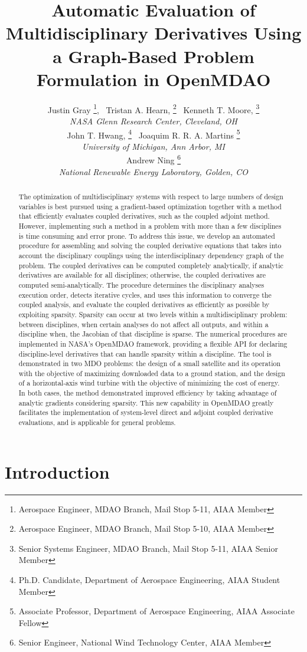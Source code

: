 \documentclass[]{aiaa-tc} %
\title{Automatic Evaluation of Multidisciplinary Derivatives Using a Graph-Based Problem Formulation in OpenMDAO}
\author{
  Justin Gray%
     \thanks{Aerospace Engineer, MDAO Branch, Mail Stop 5-11, AIAA Member},
  \ Tristan A. Hearn,%
     \thanks{Aerospace Engineer, MDAO Branch, Mail Stop 5-10, AIAA Member}
  \ Kenneth T. Moore,%
     \thanks{Senior Systems Engineer, MDAO Branch, Mail Stop 5-11, AIAA Senior Member}
   \\
  {\normalsize\itshape
  NASA Glenn Research Center, Cleveland, OH}  \\
  John T. Hwang,%
  \thanks{Ph.D. Candidate, Department of Aerospace Engineering, AIAA Student Member}
  \ Joaquim R. R. A. Martins%
  \thanks{Associate Professor, Department of Aerospace Engineering, AIAA Associate Fellow}
  \\
  {\normalsize\itshape
   University of Michigan, Ann Arbor, MI}\\
  Andrew Ning
    \thanks{Senior Engineer, National Wind Technology Center, AIAA Member}
  \\
  {\normalsize\itshape
   National Renewable Energy Laboratory, Golden, CO}
}
\begin{document}
  \maketitle

  \begin{abstract}

The optimization of multidisciplinary systems with respect to large numbers of design variables is best pursued using a gradient-based optimization together with a method that efficiently evaluates coupled derivatives, such as the coupled adjoint method. However, implementing such a method in a problem with more than a few disciplines is time consuming and error prone. To address this issue, we develop an automated procedure for assembling and solving the coupled derivative equations that takes into account the disciplinary couplings using the interdisciplinary dependency graph of the problem. The coupled derivatives can be computed completely analytically, if analytic derivatives are available for all disciplines; otherwise, the coupled derivatives are computed semi-analytically. The procedure determines the disciplinary analyses execution order, detects iterative cycles, and uses this information to converge the coupled analysis, and evaluate the coupled derivatives as efficiently as possible by exploiting sparsity. Sparsity can occur at two levels within a multidisciplinary problem: between disciplines, when certain analyses do not affect all outputs, and within a discipline when, the Jacobian of that discipline is sparse. The numerical procedures are implemented in NASA's OpenMDAO framework, providing a flexible API for declaring discipline-level derivatives that can handle sparsity within a discipline.  The tool is demonstrated in two MDO problems: the design of a small satellite and its operation with the objective of maximizing downloaded data to a ground station, and the design of a horizontal-axis wind turbine with the objective of minimizing the cost of energy. In both cases, the method demonstrated improved efficiency by taking advantage of analytic gradients considering sparsity. This new capability in OpenMDAO greatly facilitates the implementation of system-level direct and adjoint coupled derivative evaluations, and is applicable for general problems.

  \end{abstract}

  \section{Introduction}
\end{document}
